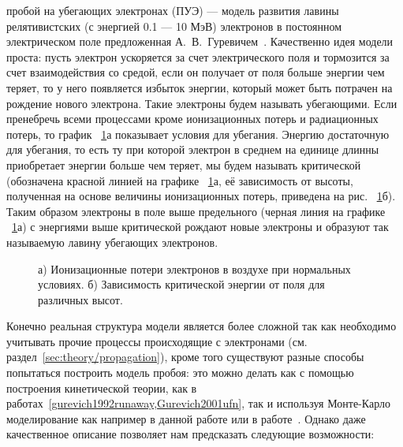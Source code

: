 пробой на убегающих электронах (ПУЭ) --- модель развития лавины релятивистских (с энергией 0.1 --- 10 МэВ) электронов в постоянном электрическом поле предложенная А.~В.~Гуревичем~\cite{gurevich1992runaway,Gurevich2001ufn}. Качественно идея модели проста: пусть электрон ускоряется за счет электрического поля и тормозится за счет взаимодействия со средой, если он получает от поля больше энергии чем теряет, то у него появляется избыток энергии, который может быть потрачен на рождение нового электрона. Такие электроны будем называть убегающими. Если пренебречь всеми процессами кроме ионизационных потерь и радиационных потерь, то график ~\ref{fig:storm:gurevich}а показывает условия для убегания. Энергию достаточную для убегания, то есть ту при которой электрон в среднем на единице длинны приобретает энергии больше чем теряет, мы будем называть критической (обозначена красной линией на графике ~\ref{fig:storm:gurevich}а, её зависимость  от высоты, полученная на основе величины ионизационных потерь, приведена на рис. ~\ref{fig:storm:gurevich}б). Таким образом электроны в поле выше предельного (черная линия на графике ~\ref{fig:storm:gurevich}а) с энергиями выше критической рождают новые электроны и образуют так называемую лавину убегающих электронов. 
%
\begin{figure}[t]
    \begin{center}
        \begin{minipage}[h]{0.49\linewidth}
        \end{minipage}
        \hfill
        \begin{minipage}[h]{0.49\linewidth}
        \end{minipage}
        \caption{а) Ионизационные потери электронов в воздухе при нормальных условиях. б) Зависимость критической энергии от поля для различных высот.}
    \end{center}
    \label{fig:storm:gurevich}
\end{figure}
Конечно реальная структура модели является более сложной так как необходимо учитывать прочие процессы происходящие с электронами (см. раздел~\ref{sec:theory/propagation}), кроме того существуют разные способы попытаться построить модель пробоя: это можно делать как с помощью построения кинетической теории, как в работах~\ref{gurevich1992runaway,Gurevich2001ufn}, так и используя Монте-Карло моделирование как например в данной работе или в работе~\cite{dwyer2003fundamental}. Однако даже качественное описание позволяет нам предсказать следующие возможности:
